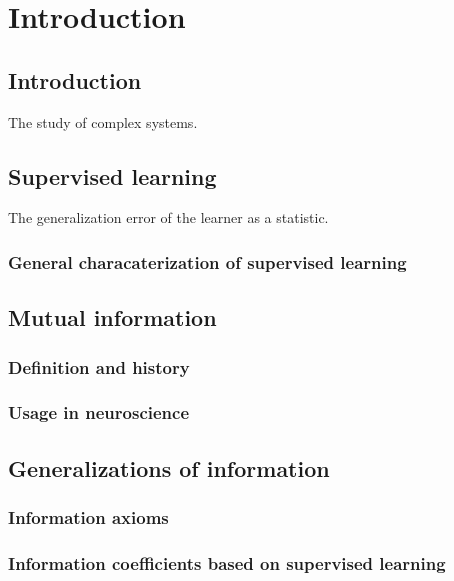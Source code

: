 
\chapter{Introduction} %

\label{Chapter1} %


\newcommand{\keyword}[1]{\textbf{#1}}
\newcommand{\tabhead}[1]{\textbf{#1}}
\newcommand{\code}[1]{\texttt{#1}}
\newcommand{\file}[1]{\texttt{\bfseries#1}}
\newcommand{\option}[1]{\texttt{\itshape#1}}



\section{Introduction}

The study of complex systems.

\section{Supervised learning}

The generalization error of the learner as a statistic.

\subsection{General characaterization of supervised learning}

\section{Mutual information}

\subsection{Definition and history}

\subsection{Usage in neuroscience}

\section{Generalizations of information}

\subsection{Information axioms}

\subsection{Information coefficients based on supervised learning}

